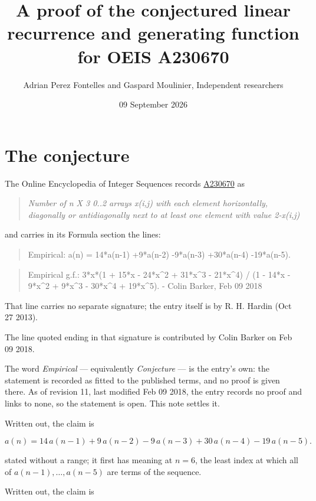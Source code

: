 \documentclass[11pt]{article}
\title{A proof of the conjectured linear recurrence and generating function for OEIS A230670}
\author{Adrian Perez Fontelles and Gaspard Moulinier, Independent researchers}
\date{09 September 2026}
\theoremstyle{definition}
\begin{document}
\maketitle
\section{The conjecture}

The Online Encyclopedia of Integer Sequences records \href{https://oeis.org/A230670}{A230670} as

\begin{quote}\itshape Number of n X 3 0..2 arrays x(i,j) with each element horizontally, diagonally or antidiagonally next to at least one element with value 2-x(i,j)\end{quote}

and carries in its Formula section the lines:

\begin{quote}\ttfamily Empirical: a(n) = 14*a(n-1) +9*a(n-2) -9*a(n-3) +30*a(n-4) -19*a(n-5).\end{quote}

\begin{quote}\ttfamily Empirical g.f.: 3*x*(1 + 15*x - 24*x\textasciicircum{}2 + 31*x\textasciicircum{}3 - 21*x\textasciicircum{}4) / (1 - 14*x - 9*x\textasciicircum{}2 + 9*x\textasciicircum{}3 - 30*x\textasciicircum{}4 + 19*x\textasciicircum{}5). - Colin Barker, Feb 09 2018\end{quote}

That line carries no separate signature; the entry itself is by R. H. Hardin (Oct 27 2013).

The line quoted ending in that signature is contributed by Colin Barker on Feb 09 2018.

The word {\itshape Empirical} --- equivalently {\itshape Conjecture} --- is the entry's own: the statement is recorded as fitted to the published terms, and no proof is given there. As of revision 11, last modified Feb 09 2018, the entry records no proof and links to none, so the statement is open. This note settles it.

Written out, the claim is

\[a(n) = 14\,a(n-1) + 9\,a(n-2) - 9\,a(n-3) + 30\,a(n-4) - 19\,a(n-5).\]

stated without a range; it first has meaning at $n = 6$, the least index at which all of $a(n-1),\dots,a(n-5)$ are terms of the sequence.

Written out, the claim is
\end{document}
